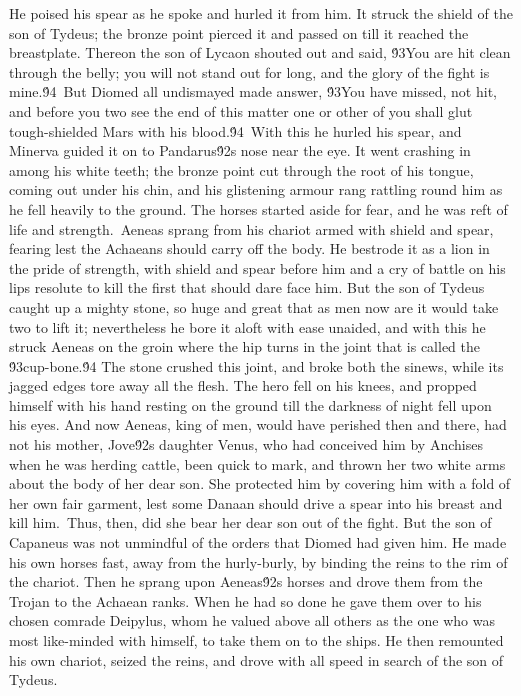 {He poised his spear as he spoke and hurled it from him. It struck the shield of the son of Tydeus; the bronze point pierced it and passed on till it reached the breastplate. Thereon the son of Lycaon shouted out and said, \'93You are hit clean through the belly; you will not stand out for long, and the glory of the fight is mine.\'94\
But Diomed all undismayed made answer, \'93You have missed, not hit, and before you two see the end of this matter one or other of you shall glut tough-shielded Mars with his blood.\'94\
With this he hurled his spear, and Minerva guided it on to Pandarus\'92s nose near the eye. It went crashing in among his white teeth; the bronze point cut through the root of his tongue, coming out under his chin, and his glistening armour rang rattling round him as he fell heavily to the ground. The horses started aside for fear, and he was reft of life and strength.\
Aeneas sprang from his chariot armed with shield and spear, fearing lest the Achaeans should carry off the body. He bestrode it as a lion in the pride of strength, with shield and spear before him and a cry of battle on his lips resolute to kill the first that should dare face him. But the son of Tydeus caught up a mighty stone, so huge and great that as men now are it would take two to lift it; nevertheless he bore it aloft with ease unaided, and with this he struck Aeneas on the groin where the hip turns in the joint that is called the \'93cup-bone.\'94 The stone crushed this joint, and broke both the sinews, while its jagged edges tore away all the flesh. The hero fell on his knees, and propped himself with his hand resting on the ground till the darkness of night fell upon his eyes. And now Aeneas, king of men, would have perished then and there, had not his mother, Jove\'92s daughter Venus, who had conceived him by Anchises when he was herding cattle, been quick to mark, and thrown her two white arms about the body of her dear son. She protected him by covering him with a fold of her own fair garment, lest some Danaan should drive a spear into his breast and kill him.\
Thus, then, did she bear her dear son out of the fight. But the son of Capaneus was not unmindful of the orders that Diomed had given him. He made his own horses fast, away from the hurly-burly, by binding the reins to the rim of the chariot. Then he sprang upon Aeneas\'92s horses and drove them from the Trojan to the Achaean ranks. When he had so done he gave them over to his chosen comrade Deipylus, whom he valued above all others as the one who was most like-minded with himself, to take them on to the ships. He then remounted his own chariot, seized the reins, and drove with all speed in search of the son of Tydeus.\
}
